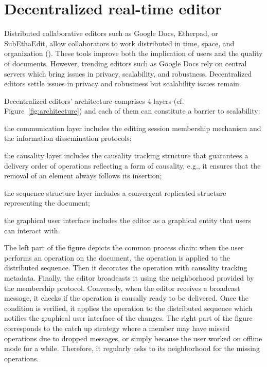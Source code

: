 
\section{Decentralized real-time editor}
\label{sec:editor}

Distributed collaborative editors such as Google Docs, Etherpad, or SubEthaEdit,
allow collaborators to work distributed in time, space, and organization
(\REF). These tools improve both the implication of users and the quality of
documents. However, trending editors such as Google Docs rely on central servers
which bring issues in privacy, scalability, and robustness. Decentralized
editors settle issues in privacy and robustness but scalability issues remain.

Decentralized editors' architecture comprises 4 layers
(cf. Figure~\ref{fig:architecture}) and each of them can constitute a barrier to
scalability:
\begin{inparaenum}[(i)]
\item the communication layer includes the editing session membership mechanism
  and the information dissemination protocols;
\item the causality layer includes the causality tracking structure that
  guarantees a delivery order of operations reflecting a form of causality,
  e.g., it ensures that the removal of an element always follows its insertion;
\item the sequence structure layer includes a convergent replicated structure
  representing the document;
\item the graphical user interface includes the editor as a graphical entity
  that users can interact with. %
\end{inparaenum}

The left part of the figure depicts the common process chain: when the user
performs an operation on the document, the operation is applied to the
distributed sequence. Then it decorates the operation with causality tracking
metadata. Finally, the editor broadcasts it using the neighborhood provided by
the membership protocol.  Conversely, when the editor receives a broadcast
message, it checks if the operation is causally ready to be delivered. Once the
condition is verified, it applies the operation to the distributed sequence
which notifies the graphical user interface of the changes.  The right part of
the figure corresponds to the catch up strategy where a member may have missed
operations due to dropped messages, or simply because the user worked on offline
mode for a while. Therefore, it regularly asks to its neighborhood for the
missing operations.

